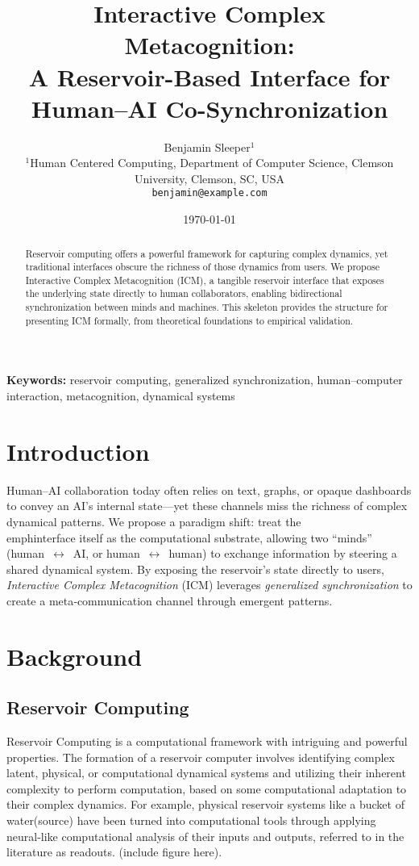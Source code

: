 \documentclass[12pt]{article}
\title{Interactive Complex Metacognition:\\A Reservoir-Based Interface for Human--AI Co-Synchronization}
\author{Benjamin Sleeper$^{1}$\\[0.5ex]\small $^{1}$Human Centered Computing, Department of Computer Science, Clemson University, Clemson, SC, USA\\ \texttt{benjamin@example.com}}
\date{\today}
\begin{document}
\maketitle

\begin{abstract}
Reservoir computing offers a powerful framework for capturing complex dynamics, yet traditional interfaces obscure the richness of those dynamics from users. We propose Interactive Complex Metacognition (ICM), a tangible reservoir interface that exposes the underlying state directly to human collaborators, enabling bidirectional synchronization between minds and machines. This skeleton provides the structure for presenting ICM formally, from theoretical foundations to empirical validation.
\end{abstract}

\bigskip
\noindent\textbf{Keywords:} reservoir computing, generalized synchronization, human--computer interaction, metacognition, dynamical systems

\section{Introduction}
Human--AI collaboration today often relies on text, graphs, or opaque dashboards to convey an AI's internal state—yet these channels miss the richness of complex dynamical patterns. We propose a paradigm shift: treat the \\emph{interface itself} as the computational substrate, allowing two ``minds'' (human~$\leftrightarrow$~AI, or human~$\leftrightarrow$~human) to exchange information by steering a shared dynamical system. By exposing the reservoir's state directly to users, \emph{Interactive Complex Metacognition} (ICM) leverages \emph{generalized synchronization} to create a meta‑communication channel through emergent patterns.
\section{Background}
\subsection{Reservoir Computing}
Reservoir Computing is a computational framework with intriguing and powerful properties. The formation of a reservoir computer involves identifying complex latent, physical, or computational dynamical systems and utilizing their inherent complexity to perform computation, based on some computational adaptation to their complex dynamics. For example, physical reservoir systems like a bucket of water(source) have been turned into computational tools through applying neural-like computational analysis of their inputs and outputs, referred to in the literature as readouts. (include figure here). 
\end{document}
